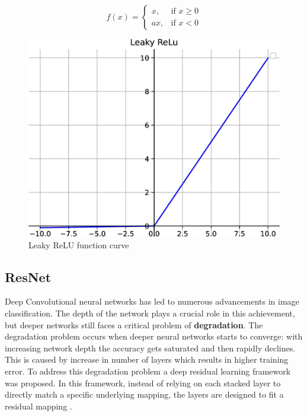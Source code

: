 \[
f(x) =
\begin{cases} 
    x, & \text{if } x \geq 0 \\
    ax, & \text{if } x < 0 
\end{cases}
\]

\begin{figure}[H]
    \centering
    \includegraphics[width=1\linewidth]{Rohit_Master_Thesis//Images/leaky_relu_af.png}
    \caption{Leaky ReLU function curve \cite{Zhao2024}}
    \label{fig:leaky relu function curve}
\end{figure}

\subsection{ResNet}
\label{subsec:ResNet}

Deep Convolutional neural networks has led to numerous advancements in image classification. The depth of the network plays a crucial role in this achievement, but deeper networks still faces a critical problem of \textbf{degradation}. The degradation problem occurs when deeper neural networks starts to converge: with increasing network depth the accuracy gets saturated and then rapidly declines. This is caused by increase in number of layers which results in higher training error. To address this degradation problem a deep residual learning framework was proposed. In this framework, instead of relying on each stacked layer to directly match a specific underlying mapping, the layers are designed to fit a residual mapping \cite{he2016deep}.

